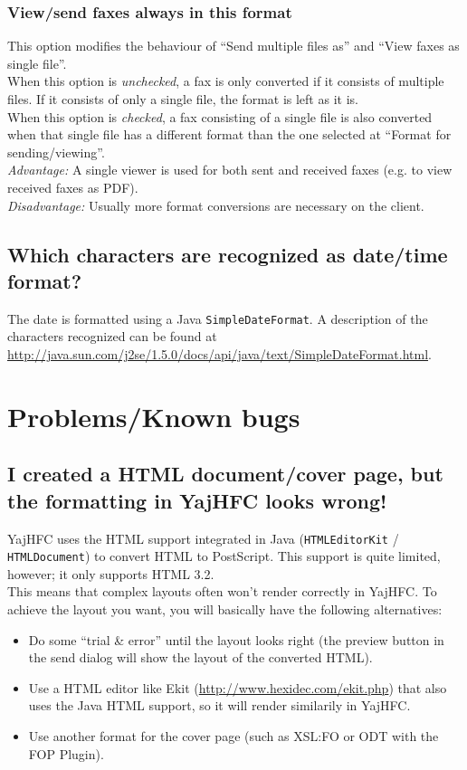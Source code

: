 \documentclass[a4paper,10pt]{scrartcl}
\begin{document}
\subsubsection{View/send faxes always in this format}
This option modifies the behaviour of ``Send multiple files as'' and ``View faxes as single file''.\\
When this option is \textit{unchecked}, a fax is only converted if it consists of multiple files. If it consists of only a single file, the format is left as it is.\\
When this option is \textit{checked}, a fax consisting of a single file is also converted when that single file has a different format than the one selected at ``Format for sending/viewing''.\\
\textit{Advantage:} A single viewer is used for both sent and received faxes (e.g. to view received faxes as PDF).\\
\textit{Disadvantage:} Usually more format conversions are necessary on the client.

\subsection{Which characters are recognized as date/time format?}

The date is formatted using a Java \texttt{SimpleDateFormat}. A description of the characters recognized can be found at \url{http://java.sun.com/j2se/1.5.0/docs/api/java/text/SimpleDateFormat.html}.

\section{Problems/Known bugs}

\subsection{I created a HTML document/cover page, but the formatting in YajHFC looks wrong!}

YajHFC uses the HTML support integrated in Java (\texttt{HTMLEditorKit} / \texttt{HTMLDocument}) to convert HTML to PostScript. This support is quite limited, however; it only supports HTML 3.2.\\
This means that complex layouts often won't render correctly in YajHFC.
To achieve the layout you want, you will basically have the following alternatives:

\begin{itemize}
 \item Do some ``trial \& error'' until the layout looks right (the preview button in the send dialog will show the layout of the converted HTML).
 \item Use a HTML editor like Ekit (\url{http://www.hexidec.com/ekit.php}) that also uses the Java HTML support, so it will render similarily in YajHFC.
 \item Use another format for the cover page (such as XSL:FO or ODT with the FOP Plugin).
\end{itemize}
\end{document}
